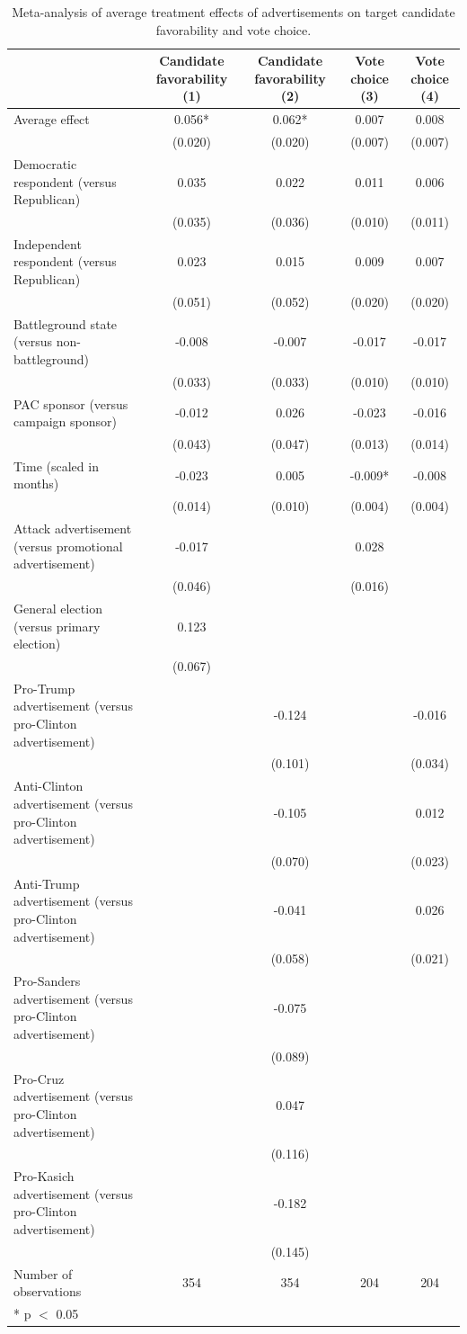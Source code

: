 \begin{table}
\centering
\caption{Meta-analysis of average treatment effects of advertisements on target candidate favorability and vote choice.}
\centering
\begin{tabular}[t]{lcccc}
\toprule
  & Candidate favorability (1) & Candidate favorability (2) & Vote choice (3) & Vote choice (4)\\
\midrule
Average effect & 0.056* & 0.062* & 0.007 & 0.008\\
 & (0.020) & (0.020) & (0.007) & (0.007)\\
Democratic respondent (versus Republican) & 0.035 & 0.022 & 0.011 & 0.006\\
 & (0.035) & (0.036) & (0.010) & (0.011)\\
Independent respondent (versus Republican) & 0.023 & 0.015 & 0.009 & 0.007\\
 & (0.051) & (0.052) & (0.020) & (0.020)\\
Battleground state (versus non-battleground) & -0.008 & -0.007 & -0.017 & -0.017\\
 & (0.033) & (0.033) & (0.010) & (0.010)\\
PAC sponsor (versus campaign sponsor) & -0.012 & 0.026 & -0.023 & -0.016\\
 & (0.043) & (0.047) & (0.013) & (0.014)\\
Time (scaled in months) & -0.023 & 0.005 & -0.009* & -0.008\\
 & (0.014) & (0.010) & (0.004) & (0.004)\\
Attack advertisement (versus promotional advertisement) & -0.017 &  & 0.028 & \\
 & (0.046) &  & (0.016) & \\
General election (versus primary election) & 0.123 &  &  & \\
 & (0.067) &  &  & \\
Pro-Trump advertisement (versus pro-Clinton advertisement) &  & -0.124 &  & -0.016\\
 &  & (0.101) &  & (0.034)\\
Anti-Clinton advertisement (versus pro-Clinton advertisement) &  & -0.105 &  & 0.012\\
 &  & (0.070) &  & (0.023)\\
Anti-Trump advertisement (versus pro-Clinton advertisement) &  & -0.041 &  & 0.026\\
 &  & (0.058) &  & (0.021)\\
Pro-Sanders advertisement (versus pro-Clinton advertisement) &  & -0.075 &  & \\
 &  & (0.089) &  & \\
Pro-Cruz advertisement (versus pro-Clinton advertisement) &  & 0.047 &  & \\
 &  & (0.116) &  & \\
Pro-Kasich advertisement (versus pro-Clinton advertisement) &  & -0.182 &  & \\
 &  & (0.145) &  & \\
\midrule
Number of observations & 354 & 354 & 204 & 204\\
\bottomrule
\multicolumn{5}{l}{\rule{0pt}{1em}* p $<$ 0.05}\\
\end{tabular}
\end{table}
